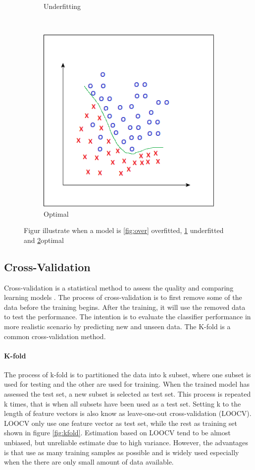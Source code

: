 \documentclass[USenglish]{ifimaster}  %
\begin{document}
\begin{figure}[h]
\begin{subfigure}{.5\linewidth}
			\caption{Underfitting}
			\label{fig:under}
		\end{subfigure}\\[1ex]
		\begin{subfigure}{\linewidth}
			\centering
			\includegraphics[scale=0.43]{Figures/Finefitting}
			\caption{Optimal}
			\label{fig:optimal}
		\end{subfigure}
		\caption{Figur illustrate when a model is \ref{fig:over} overfitted, \ref{fig:under} underfitted and \ref{fig:optimal}optimal }
		\label{fig:fitting}	
	\end{figure}
	
	\FloatBarrier
	
\subsection{Cross-Validation}
Cross-validation is a statistical method to assess the quality and comparing learning models \cite{Refaeilzadeh2009}. The process of cross-validation is to first remove some of the data before the training begins. After the training, it will use the removed data to test the performance. The intention is to evaluate the classifier performance in more realistic scenario by predicting new and unseen data. The K-fold is a common cross-validation method.
	
\paragraph{K-fold}
The process of k-fold is to partitioned the data into k subset, where one subset is used for testing and the other are used for training. When the trained model has assessed the test set, a new subset is selected as test set. This process is repeated k times, that is when all subsets have been used as a test set. Setting k to the length of feature vectors is also know as leave-one-out cross-validation (LOOCV). LOOCV only use one feature vector as test set, while the rest as training set shown in figure \ref{fig:kfold}. Estimation based on LOOCV tend to be almost unbiased, but unreliable estimate due to high variance. However, the advantages is that use as many training samples as possible and is widely used especially when the there are only  small amount of data available. 
 	
\end{document}
